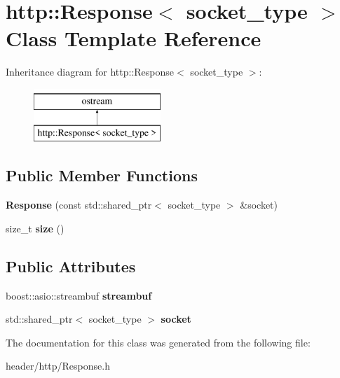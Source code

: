 \hypertarget{classhttp_1_1_response}{}\section{http\+:\+:Response$<$ socket\+\_\+type $>$ Class Template Reference}
\label{classhttp_1_1_response}
Inheritance diagram for http\+:\+:Response$<$ socket\+\_\+type $>$\+:\begin{figure}[H]
\begin{center}
\leavevmode
\includegraphics[height=2.000000cm]{d2/d8f/classhttp_1_1_response}
\end{center}
\end{figure}
\subsection*{Public Member Functions}
\begin{DoxyCompactItemize}
\item 
\mbox{\label{classhttp_1_1_response_a8feb8d8486a139188ed975b5c9818c05}} 
{\bfseries Response} (const std\+::shared\+\_\+ptr$<$ socket\+\_\+type $>$ \&socket)
\item 
\mbox{\label{classhttp_1_1_response_a403c2bf382d1c050aed71f7e5b2b16ae}} 
size\+\_\+t {\bfseries size} ()
\end{DoxyCompactItemize}
\subsection*{Public Attributes}
\begin{DoxyCompactItemize}
\item 
\mbox{\label{classhttp_1_1_response_a6d6d60120a6b5eafa78d893f6214735c}} 
boost\+::asio\+::streambuf {\bfseries streambuf}
\item 
\mbox{\label{classhttp_1_1_response_af3b52589514cfe8b823cac848720d978}} 
std\+::shared\+\_\+ptr$<$ socket\+\_\+type $>$ {\bfseries socket}
\end{DoxyCompactItemize}


The documentation for this class was generated from the following file\+:\begin{DoxyCompactItemize}
\item 
header/http/Response.\+h\end{DoxyCompactItemize}

